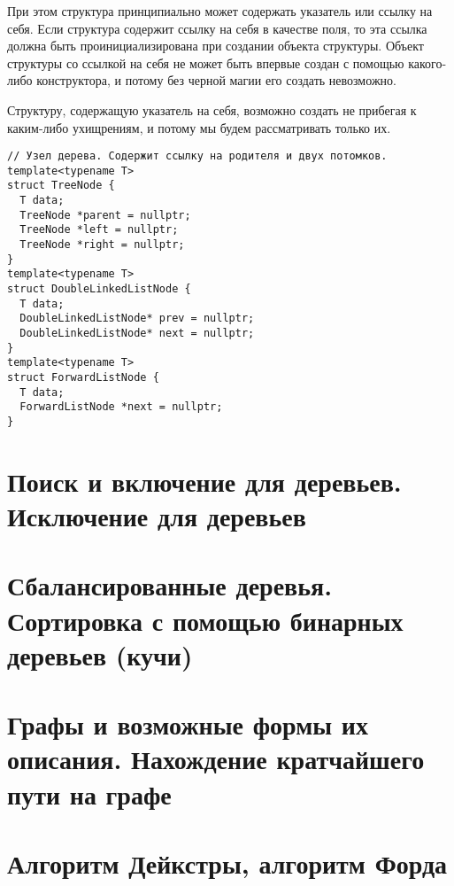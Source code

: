 При этом структура принципиально может содержать указатель или ссылку на себя. Если структура содержит ссылку на себя
в качестве поля, то эта ссылка должна быть проинициализирована при создании объекта структуры. Объект структуры со
ссылкой на себя не может быть впервые создан с помощью какого-либо конструктора, и потому без черной магии его
создать невозможно.

Структуру, содержащую указатель на себя, возможно создать не прибегая к каким-либо ухищрениям,
и потому мы будем рассматривать только их.

\begin{verbatim}
// Узел дерева. Содержит ссылку на родителя и двух потомков.
template<typename T>
struct TreeNode {
  T data;
  TreeNode *parent = nullptr;
  TreeNode *left = nullptr;
  TreeNode *right = nullptr;
}
template<typename T>
struct DoubleLinkedListNode {
  T data;
  DoubleLinkedListNode* prev = nullptr;
  DoubleLinkedListNode* next = nullptr;
}
template<typename T>
struct ForwardListNode {
  T data;
  ForwardListNode *next = nullptr;
}
\end{verbatim}

\section{Поиск и включение для деревьев. Исключение для деревьев}
\label{sec:tree-node-ops}
\section{Сбалансированные деревья. Сортировка с помощью бинарных деревьев (кучи)}
\section{Графы и возможные формы их описания. Нахождение кратчайшего пути на графе}
\section{Алгоритм Дейкстры, алгоритм Форда}